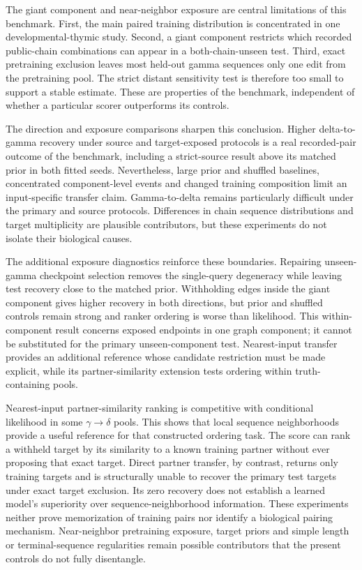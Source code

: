 \documentclass[12pt]{article}
\newcommand{\gtd}{\mbox{\ensuremath{\gamma\!\rightarrow\!\delta}}}
\begin{document}
The giant component and near-neighbor exposure are central limitations of
this benchmark. First, the main paired training distribution is concentrated in one
developmental-thymic study. Second, a giant component restricts which recorded
public-chain combinations can appear in a both-chain-unseen test. Third, exact
pretraining exclusion leaves most held-out gamma sequences only one edit from
the pretraining pool. The strict distant sensitivity test is therefore too small
to support a stable estimate. These are properties of the benchmark, independent
of whether a particular scorer outperforms its controls.

The direction and exposure comparisons sharpen this conclusion. Higher
delta-to-gamma recovery under source and target-exposed protocols is a real
recorded-pair outcome of the benchmark, including a strict-source result above
its matched prior in both fitted seeds. Nevertheless, large prior and shuffled
baselines, concentrated component-level events and changed training composition
limit an input-specific transfer claim. Gamma-to-delta remains particularly
difficult under the primary and source protocols. Differences in chain sequence
distributions and target multiplicity are plausible contributors, but these
experiments do not isolate their biological causes.

The additional exposure diagnostics reinforce these boundaries. Repairing unseen-gamma
checkpoint selection removes the single-query degeneracy while leaving test
recovery close to the matched prior. Withholding edges inside the giant
component gives higher recovery in both directions, but prior and shuffled
controls remain strong and ranker ordering is worse than likelihood. This
within-component result concerns exposed endpoints in one graph component;
it cannot be substituted for the primary unseen-component test. Nearest-input
transfer provides an additional reference whose candidate restriction must be
made explicit, while its partner-similarity extension tests ordering within
truth-containing pools.

Nearest-input partner-similarity ranking is competitive with conditional
likelihood in some \gtd{} pools. This shows that local sequence neighborhoods
provide a useful reference for that constructed ordering task. The score can
rank a withheld target by its similarity to a known training partner without
ever proposing that exact target. Direct partner transfer, by contrast, returns
only training targets and is structurally unable to recover the primary test
targets under exact target exclusion. Its zero recovery does not establish a
learned model's superiority over sequence-neighborhood information. These
experiments neither prove memorization of training pairs nor identify a
biological pairing mechanism. Near-neighbor pretraining exposure, target priors
and simple length or terminal-sequence regularities remain possible contributors
that the present controls do not fully disentangle.
\end{document}
